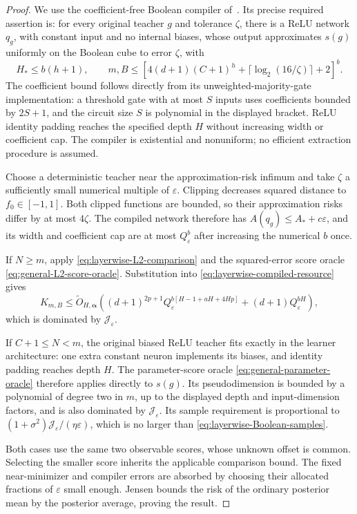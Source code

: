 \begin{proof}
We use the coefficient-free Boolean compiler of~\cite{boolean}. Its precise required assertion is: for every original teacher $g$ and tolerance $\zeta$, there is a ReLU network $q_g$, with constant input and no internal biases, whose output approximates $s(g)$ uniformly on the Boolean cube to error $\zeta$, with
\[
 H_*\le b(h+1),\qquad
 m,B\le\left[4(d+1)(C+1)^h+
                  \lceil\log_2(16/\zeta)\rceil+2\right]^b.
\]
The coefficient bound follows directly from its unweighted-majority-gate implementation: a threshold gate with at most $S$ inputs uses coefficients bounded by $2S+1$, and the circuit size $S$ is polynomial in the displayed bracket. ReLU identity padding reaches the specified depth $H$ without increasing width or coefficient cap. The compiler is existential and nonuniform; no efficient extraction procedure is assumed.

Choose a deterministic teacher near the approximation-risk infimum and take $\zeta$ a sufficiently small numerical multiple of $\varepsilon$. Clipping decreases squared distance to $f_0\in[-1,1]$. Both clipped functions are bounded, so their approximation risks differ by at most $4\zeta$. The compiled network therefore has $A(q_g)\le A_*+c\varepsilon$, and its width and coefficient cap are at most $Q_\varepsilon^b$ after increasing the numerical $b$ once.

If $N\ge m$, apply \eqref{eq:layerwise-L2-comparison} and the squared-error score oracle \eqref{eq:general-L2-score-oracle}. Substitution into \eqref{eq:layerwise-compiled-resource} gives
\[
 K_{m,B}\le\widetilde O_{H,\boldsymbol\alpha}
   ((d+1)^{2p+1}Q_\varepsilon^{b[H-1+aH+4Hp]}
      +(d+1)Q_\varepsilon^{bH}),
\]
which is dominated by $\mathcal J_\varepsilon$.

If $C+1\le N<m$, the original biased ReLU teacher fits exactly in the learner architecture: one extra constant neuron implements its biases, and identity padding reaches depth $H$. The parameter-score oracle \eqref{eq:general-parameter-oracle} therefore applies directly to $s(g)$. Its pseudodimension is bounded by a polynomial of degree two in $m$, up to the displayed depth and input-dimension factors, and is also dominated by $\mathcal J_\varepsilon$. Its sample requirement is proportional to $(1+\sigma^2)\mathcal J_\varepsilon/(\eta\varepsilon)$, which is no larger than \eqref{eq:layerwise-Boolean-samples}.

Both cases use the same two observable scores, whose unknown offset is common. Selecting the smaller score inherits the applicable comparison bound. The fixed near-minimizer and compiler errors are absorbed by choosing their allocated fractions of $\varepsilon$ small enough. Jensen bounds the risk of the ordinary posterior mean by the posterior average, proving the result.
\end{proof}

